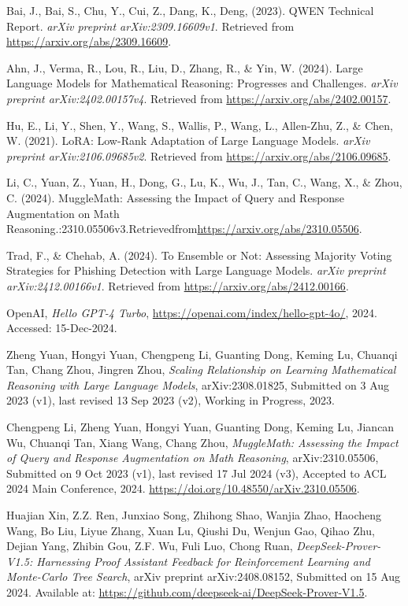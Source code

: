 \documentclass{article}
\begin{document}
{
\small
\begin{thebibliography}{99}  

   Bai, J., Bai, S., Chu, Y., Cui, Z., Dang, K., Deng, (2023). QWEN Technical Report. {\it arXiv preprint arXiv:2309.16609v1}. Retrieved from \url{https://arxiv.org/abs/2309.16609}.
  
   Ahn, J., Verma, R., Lou, R., Liu, D., Zhang, R., \& Yin, W. (2024). Large Language Models for Mathematical Reasoning: Progresses and Challenges. {\it arXiv preprint arXiv:2402.00157v4}. Retrieved from \url{https://arxiv.org/abs/2402.00157}.
  
   Hu, E., Li, Y., Shen, Y., Wang, S., Wallis, P., Wang, L., Allen-Zhu, Z., \& Chen, W. (2021). LoRA: Low-Rank Adaptation of Large Language Models. {\it arXiv preprint arXiv:2106.09685v2}. Retrieved from \url{https://arxiv.org/abs/2106.09685}.
  

   Li, C., Yuan, Z., Yuan, H., Dong, G., Lu, K., Wu, J., Tan, C., Wang, X., \& Zhou, C. (2024). MuggleMath: Assessing the Impact of Query and Response Augmentation on Math Reasoning.{\itarXivpreprintarXiv:2310.05506v3}.Retrievedfrom\url{https://arxiv.org/abs/2310.05506}.

   Trad, F., \& Chehab, A. (2024). To Ensemble or Not: Assessing Majority Voting Strategies for Phishing Detection with Large Language Models. {\it arXiv preprint arXiv:2412.00166v1}. Retrieved from \url{https://arxiv.org/abs/2412.00166}.

   OpenAI, \emph{Hello GPT-4 Turbo}, \url{https://openai.com/index/hello-gpt-4o/}, 2024. Accessed: 15-Dec-2024.

   Zheng Yuan, Hongyi Yuan, Chengpeng Li, Guanting Dong, Keming Lu, Chuanqi Tan, Chang Zhou, Jingren Zhou, \emph{Scaling Relationship on Learning Mathematical Reasoning with Large Language Models}, arXiv:2308.01825, Submitted on 3 Aug 2023 (v1), last revised 13 Sep 2023 (v2), Working in Progress, 2023.

   Chengpeng Li, Zheng Yuan, Hongyi Yuan, Guanting Dong, Keming Lu, Jiancan Wu, Chuanqi Tan, Xiang Wang, Chang Zhou, \emph{MuggleMath: Assessing the Impact of Query and Response Augmentation on Math Reasoning}, arXiv:2310.05506, Submitted on 9 Oct 2023 (v1), last revised 17 Jul 2024 (v3), Accepted to ACL 2024 Main Conference, 2024. \url{https://doi.org/10.48550/arXiv.2310.05506}.

   Huajian Xin, Z.Z. Ren, Junxiao Song, Zhihong Shao, Wanjia Zhao, Haocheng Wang, Bo Liu, Liyue Zhang, Xuan Lu, Qiushi Du, Wenjun Gao, Qihao Zhu, Dejian Yang, Zhibin Gou, Z.F. Wu, Fuli Luo, Chong Ruan, \emph{DeepSeek-Prover-V1.5: Harnessing Proof Assistant Feedback for Reinforcement Learning and Monte-Carlo Tree Search}, arXiv preprint arXiv:2408.08152, Submitted on 15 Aug 2024. Available at: \url{https://github.com/deepseek-ai/DeepSeek-Prover-V1.5}.

\end{thebibliography}
}
\end{document}
